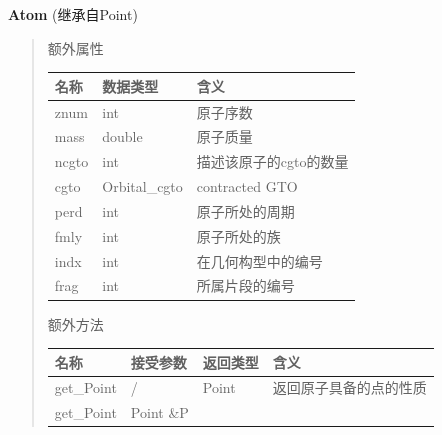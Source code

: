 \documentclass[11pt]{article}
\begin{document}
\textbf{Atom} (继承自Point)

\begin{quote}
额外属性

\begin{longtable}[]{@{}lll@{}}
\toprule
名称 & 数据类型 & 含义\tabularnewline
\midrule
\endhead
znum & int & 原子序数\tabularnewline
mass & double & 原子质量\tabularnewline
ncgto & int & 描述该原子的cgto的数量\tabularnewline
cgto & Orbital\_cgto & contracted GTO\tabularnewline
perd & int & 原子所处的周期\tabularnewline
fmly & int & 原子所处的族\tabularnewline
indx & int & 在几何构型中的编号\tabularnewline
frag & int & 所属片段的编号\tabularnewline
\bottomrule
\end{longtable}

额外方法

\begin{longtable}[]{@{}llll@{}}
\toprule
\begin{minipage}[b]{0.11\columnwidth}\raggedright\strut
名称\strut
\end{minipage} & \begin{minipage}[b]{0.28\columnwidth}\raggedright\strut
接受参数\strut
\end{minipage} & \begin{minipage}[b]{0.06\columnwidth}\raggedright\strut
返回类型\strut
\end{minipage} & \begin{minipage}[b]{0.43\columnwidth}\raggedright\strut
含义\strut
\end{minipage}\tabularnewline
\midrule
\endhead
\begin{minipage}[t]{0.11\columnwidth}\raggedright\strut
get\_Point\strut
\end{minipage} & \begin{minipage}[t]{0.28\columnwidth}\raggedright\strut
/\strut
\end{minipage} & \begin{minipage}[t]{0.06\columnwidth}\raggedright\strut
Point\strut
\end{minipage} & \begin{minipage}[t]{0.43\columnwidth}\raggedright\strut
返回原子具备的点的性质\strut
\end{minipage}\tabularnewline
\begin{minipage}[t]{0.11\columnwidth}\raggedright\strut
get\_Point\strut
\end{minipage} & \begin{minipage}[t]{0.28\columnwidth}\raggedright\strut
Point \&P\strut
\end{minipage} & \begin{minipage}[t]{0.06\columnwidth}\raggedright\strut

\end{minipage}
\end{longtable}
\end{quote}
\end{document}
